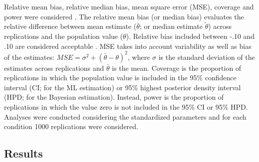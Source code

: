 \documentclass[graybox]{svmult}
\begin{document}
 Relative mean bias, relative median bias, mean square error (MSE), coverage and power were considered \cite{smidSemSmallSamples2020}. The relative mean bias (or median bias) evaluates the relative difference between mean estimate ($\bar{\theta}$; or median estimate $\widetilde{\theta}$) across replications and the population value ($\theta$).
Relative bias included between -.10 and .10 are considered acceptable \cite{smidSemSmallSamples2020}. MSE takes into account variability as well as bias of the estimates: $MSE = \sigma^2 + (\bar{\theta}- \theta)^2$, where $\sigma$ is the standard deviation of the estimates across replications and $\bar{\theta}$ is the mean. Coverage is the proportion of replications in which the population value is included in the 95\% confidence interval (CI; for the ML estimation) or 95\% highest posterior density interval (HPD; for the Bayesian estimation). Instead, power is the proportion of replications in which the value zero is not included in the 95\% CI or 95\% HPD. Analyses were conducted considering the standardized parameters and for each condition 1000 replications were considered.

\subsection{Results}
\end{document}
